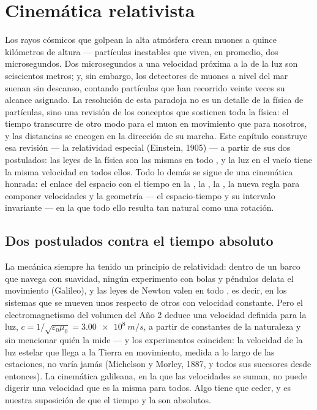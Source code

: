 \chapter{Cinemática relativista}\label{ch:b3:relativistic-kinematics}

Los rayos cósmicos que golpean la alta atmósfera crean muones a quince
kilómetros de altura --- partículas inestables que viven, en promedio, dos
microsegundos. Dos microsegundos a una velocidad próxima a la de la luz son
seiscientos metros; y, sin embargo, los detectores de muones a nivel del mar
suenan sin descanso, contando partículas que han recorrido veinte veces su
alcance asignado. La resolución de esta paradoja no es un detalle de la
física de partículas, sino una revisión de los conceptos que sostienen toda
la física: el tiempo transcurre de otro modo para el muon en movimiento que
para nosotros, y las distancias se encogen en la dirección de su marcha.
Este capítulo construye esa revisión --- la relatividad especial (Einstein,
1905) --- a partir de sus dos postulados: las leyes de la física son las
mismas en todo , y la luz en el vacío tiene la misma
velocidad en todos ellos. Todo lo demás se sigue de una cinemática honrada:
el enlace del espacio con el tiempo en la , la
, la , la nueva regla para
componer velocidades y la geometría --- el espacio-tiempo y su intervalo
invariante --- en la que todo ello resulta tan natural como una rotación.

\section{Dos postulados contra el tiempo absoluto}

\begin{remark}\label{rem:b3:relativistic-kinematics:conflict}
La mecánica siempre ha tenido un principio de relatividad: dentro de un
barco que navega con suavidad, ningún experimento con bolas y péndulos
delata el movimiento (Galileo), y las leyes de Newton valen en todo
\emph{}, es decir, en los sistemas que se mueven unos
respecto de otros con velocidad constante. Pero el electromagnetismo del
volumen del Año 2 deduce una velocidad definida para la luz, $c = 1/\sqrt{\varepsilon_0\mu_0} =
\qty{3.00e8}{m/s}$, a partir de constantes de la naturaleza y sin mencionar
quién la mide --- y los
experimentos coinciden: la velocidad de la luz estelar que llega a la Tierra
en movimiento, medida a lo largo de las estaciones, no varía jamás
(Michelson y Morley, 1887, y todos sus sucesores desde entonces). La
cinemática galileana, en la que las velocidades se suman, no puede digerir
una velocidad que es la misma para todos. Algo tiene que ceder, y es nuestra
suposición de que el tiempo y la  son absolutos.
\end{remark}

